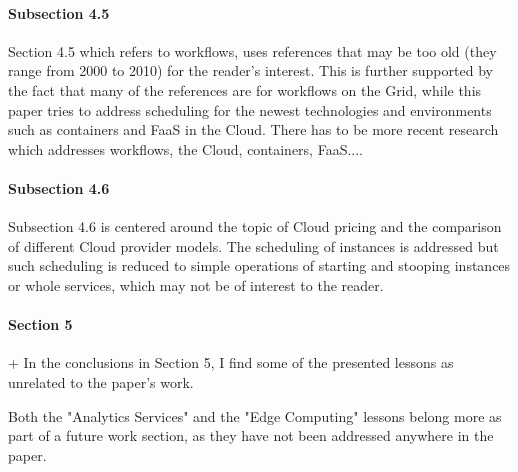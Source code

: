 
\paragraph{Subsection 4.5}

Section 4.5 which refers to workflows, uses references that may
be too old (they range from 2000 to 2010) for the reader's interest.
This is further supported by the fact that many of the references are
for workflows on the Grid, while this paper tries to address
scheduling for the newest technologies and environments such as
containers and FaaS in the Cloud. There has to be more recent research
which addresses workflows, the Cloud, containers, FaaS....



\paragraph{Subsection 4.6}

Subsection 4.6 is centered around the topic of Cloud pricing and the
comparison of different Cloud provider models. The scheduling of
instances is addressed but such scheduling is reduced to simple
operations of starting and stooping instances or whole services, which
may not be of interest to the reader.


\paragraph{Section 5}

+ In the conclusions in Section 5, I find some of the presented
lessons as unrelated to the paper's work. 

Both the "Analytics
Services" and the "Edge Computing" lessons belong more as part of a
future work section, as they have not been addressed anywhere in the
paper. 

